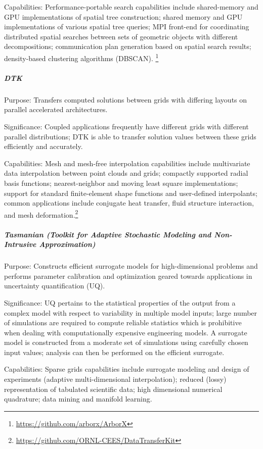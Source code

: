 Capabilities: Performance-portable search capabilities include shared-memory and GPU
implementations of spatial tree construction; shared memory and GPU
implementations of various spatial tree queries; MPI front-end for
coordinating distributed spatial searches between sets of geometric objects
with different decompositions; communication plan generation based on spatial
search results; density-based clustering algorithms (DBSCAN).
\footnote{\url{https://github.com/arborx/ArborX}}

\subparagraph{DTK}

Purpose: Transfers computed solutions between grids with differing
layouts on parallel accelerated architectures.

Significance: Coupled applications frequently have different grids with
different parallel distributions; DTK is able to transfer solution values
between these grids efficiently and accurately.

Capabilities: Mesh and mesh-free interpolation capabilities include multivariate data
interpolation between point clouds and grids; compactly supported radial basis
functions; nearest-neighbor and moving least square implementations; support
for standard finite-element shape functions and user-defined interpolants;
common applications include conjugate heat transfer, fluid structure
interaction, and mesh deformation.\footnote{\url{https://github.com/ORNL-CEES/DataTransferKit}}


\subparagraph{Tasmanian (Toolkit for Adaptive Stochastic Modeling and Non-Intrusive
Approximation)}

Purpose: Constructs efficient surrogate models for high-dimensional
problems and performs parameter calibration and optimization geared towards
applications in uncertainty quantification (UQ).

Significance: UQ pertains to the statistical properties of the output
from a complex model with respect to variability in multiple model inputs;
large number of simulations are required to compute reliable statistics which
is prohibitive when dealing with computationally expensive engineering
models. A surrogate model is constructed from a moderate set of simulations
using carefully chosen input values; analysis can then be performed on the
efficient surrogate.

Capabilities: Sparse grids capabilities include surrogate modeling and design of experiments
(adaptive multi-dimensional interpolation); reduced (lossy) representation of
tabulated scientific data; high dimensional numerical quadrature; data mining
and manifold learning.

